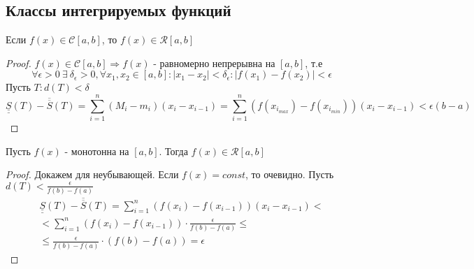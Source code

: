 \subsection{Классы интегрируемых функций}
\begin{theorem}
    Если $f(x)\in \mathcal{C}[a,b]$, то $f(x)\in \mathcal{R}[a,b]$
\end{theorem} 
\begin{proof}
    $f(x)\in \mathcal{C}[a,b] \Rightarrow f(x)$ - равномерно непрерывна на $[a,b]$, т.е
    \[\forall \epsilon>0\ \exists\ \delta_{\epsilon}>0, \forall x_1, x_2\in [a,b]: |x_1-x_2|<\delta_{\epsilon}: |f(x_1)-f(x_2)|<\epsilon\]
    Пусть $T: d(T)<\delta$
    \[\underline{\underline{S}}(T)-\overline{\overline{S}}(T)=\sum\limits_{i=1}^{n}(M_i-m_i)(x_i-x_{i-1})=\sum\limits_{i=1}^{n}(f(x_{i_{max}})-f(x_{i_{min}}))(x_i-x_{i-1})<\epsilon(b-a)\]
\end{proof} 
\begin{theorem}
    Пусть $f(x)$ - монотонна на $[a,b]$. Тогда $f(x)\in \mathcal{R}[a,b]$
\end{theorem} 
\begin{proof}
    Докажем для неубывающей. Если $f(x)=const$, то очевидно.
    Пусть $d(T)<\frac{\epsilon}{f(b)-f(a)}$
    \begin{multline*}
        \underline{\underline{S}}(T)-\overline{\overline{S}}(T)=\sum\limits_{i=1}^{n}(f(x_i)-f(x_{i-1}))(x_i-x_{i-1})<\\
        <\sum\limits_{i=1}^{n}(f(x_i)-f(x_{i-1}))\cdot \frac{\epsilon}{f(b)-f(a)}\leq\\
        \leq\frac{\epsilon}{f(b)-f(a)}\cdot (f(b)-f(a))=\epsilon
    \end{multline*}
\end{proof} 
